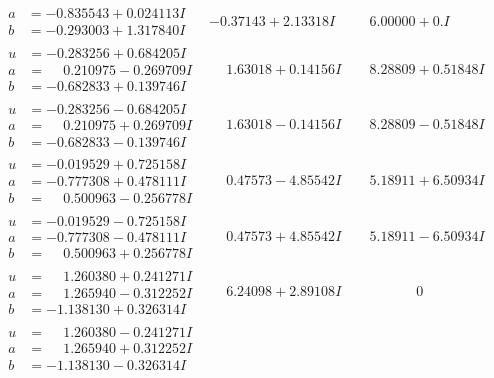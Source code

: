 \documentclass[1p]{elsarticle_modified}
\theoremstyle{definition}
\begin{document}
$$\begin{array}{c|c|c}
\begin{aligned}
a &= -0.835543 + 0.024113 I \\
b &= -0.293003 + 1.317840 I\end{aligned}
 & -0.37143 + 2.13318 I & \phantom{-}6.00000 + 0. I\phantom{ +0.000000I} \\ \hline\begin{aligned}
u &= -0.283256 + 0.684205 I \\
a &= \phantom{-}0.210975 - 0.269709 I \\
b &= -0.682833 + 0.139746 I\end{aligned}
 & \phantom{-}1.63018 + 0.14156 I & \phantom{-}8.28809 + 0.51848 I \\ \hline\begin{aligned}
u &= -0.283256 - 0.684205 I \\
a &= \phantom{-}0.210975 + 0.269709 I \\
b &= -0.682833 - 0.139746 I\end{aligned}
 & \phantom{-}1.63018 - 0.14156 I & \phantom{-}8.28809 - 0.51848 I \\ \hline\begin{aligned}
u &= -0.019529 + 0.725158 I \\
a &= -0.777308 + 0.478111 I \\
b &= \phantom{-}0.500963 - 0.256778 I\end{aligned}
 & \phantom{-}0.47573 - 4.85542 I & \phantom{-}5.18911 + 6.50934 I \\ \hline\begin{aligned}
u &= -0.019529 - 0.725158 I \\
a &= -0.777308 - 0.478111 I \\
b &= \phantom{-}0.500963 + 0.256778 I\end{aligned}
 & \phantom{-}0.47573 + 4.85542 I & \phantom{-}5.18911 - 6.50934 I \\ \hline\begin{aligned}
u &= \phantom{-}1.260380 + 0.241271 I \\
a &= \phantom{-}1.265940 - 0.312252 I \\
b &= -1.138130 + 0.326314 I\end{aligned}
 & \phantom{-}6.24098 + 2.89108 I & \phantom{-0.000000 } 0 \\ \hline\begin{aligned}
u &= \phantom{-}1.260380 - 0.241271 I \\
a &= \phantom{-}1.265940 + 0.312252 I \\
b &= -1.138130 - 0.326314 I\end{aligned}

\end{array}$$
\end{document}
